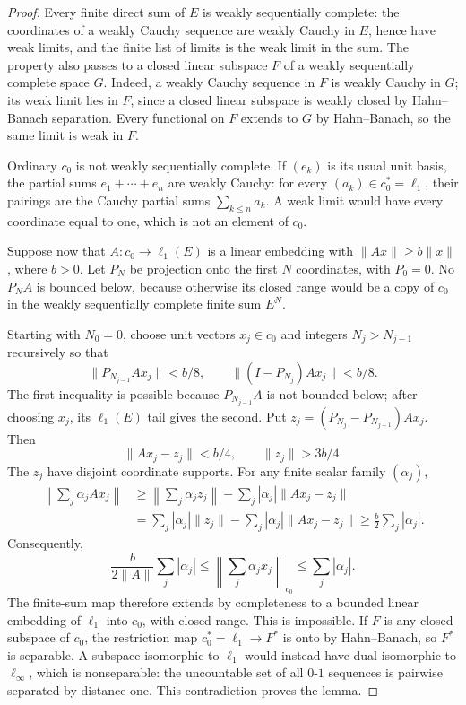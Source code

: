 \begin{proof}
Every finite direct sum of \(E\) is weakly sequentially complete:
the coordinates of a weakly Cauchy sequence are weakly Cauchy in
\(E\), hence have weak limits, and the finite list of limits is the
weak limit in the sum. The property also passes to a closed linear
subspace \(F\) of a weakly sequentially complete space \(G\).
Indeed, a weakly Cauchy sequence in \(F\) is weakly Cauchy in \(G\);
its weak limit lies in \(F\), since a closed linear subspace is
weakly closed by Hahn--Banach separation. Every functional on \(F\)
extends to \(G\) by Hahn--Banach, so the same limit is weak in \(F\).

Ordinary \(c_0\) is not weakly sequentially complete. If
\((e_k)\) is its usual unit basis, the partial sums
\(e_1+\cdots+e_n\) are weakly Cauchy: for every
\((a_k)\in c_0^*=\ell_1\), their pairings are the Cauchy partial sums
\(\sum_{k\le n}a_k\). A weak limit would have every coordinate equal
to one, which is not an element of \(c_0\).

Suppose now that \(A:c_0\to\ell_1(E)\) is a linear embedding with
\(\|Ax\|\ge b\|x\|\), where \(b>0\). Let \(P_N\) be projection onto
the first \(N\) coordinates, with \(P_0=0\). No \(P_NA\) is bounded
below, because otherwise its closed range would be a copy of \(c_0\)
in the weakly sequentially complete finite sum \(E^N\).

Starting with \(N_0=0\), choose unit vectors \(x_j\in c_0\) and
integers \(N_j>N_{j-1}\) recursively so that
\[
 \|P_{N_{j-1}}Ax_j\|<b/8,\qquad
 \|(I-P_{N_j})Ax_j\|<b/8.
\]
The first inequality is possible because \(P_{N_{j-1}}A\) is not
bounded below; after choosing \(x_j\), its \(\ell_1(E)\) tail gives
the second. Put \(z_j=(P_{N_j}-P_{N_{j-1}})Ax_j\). Then
\[
 \|Ax_j-z_j\|<b/4,\qquad \|z_j\|>3b/4.
\]
The \(z_j\) have disjoint coordinate supports. For any finite scalar
family \((\alpha_j)\),
\begin{align*}
 \left\|\sum_j\alpha_jAx_j\right\|
 &\ge \left\|\sum_j\alpha_jz_j\right\|
       -\sum_j|\alpha_j|\|Ax_j-z_j\|\\
 &=\sum_j|\alpha_j|\|z_j\|
       -\sum_j|\alpha_j|\|Ax_j-z_j\|
 \ge \frac b2\sum_j|\alpha_j|.
\end{align*}
Consequently,
\[
 \frac{b}{2\|A\|}\sum_j|\alpha_j|
 \le\left\|\sum_j\alpha_jx_j\right\|_{c_0}
 \le\sum_j|\alpha_j|.
\]
The finite-sum map therefore extends by completeness to a bounded
linear embedding of \(\ell_1\) into \(c_0\), with closed range.
This is impossible. If \(F\) is any closed subspace of \(c_0\), the
restriction map \(c_0^*=\ell_1\to F^*\) is onto by Hahn--Banach,
so \(F^*\) is separable. A subspace isomorphic to \(\ell_1\) would
instead have dual isomorphic to \(\ell_\infty\), which is
nonseparable: the uncountable set of all \(0\)-\(1\) sequences is
pairwise separated by distance one. This contradiction proves the
lemma.
\end{proof}

